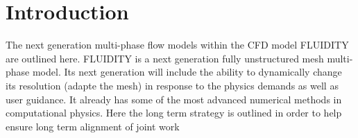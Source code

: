 
\section{Introduction}
The next generation multi-phase flow models within the
CFD model FLUIDITY are outlined here.
FLUIDITY is a next generation fully unstructured mesh multi-phase model. Its next generation will include the ability to dynamically change its resolution (adapte the mesh) in response to the physics demands as well as user guidance. It already has some of the most advanced numerical methods in computational physics. Here the long term strategy is outlined in order to help ensure long term alignment of joint work
